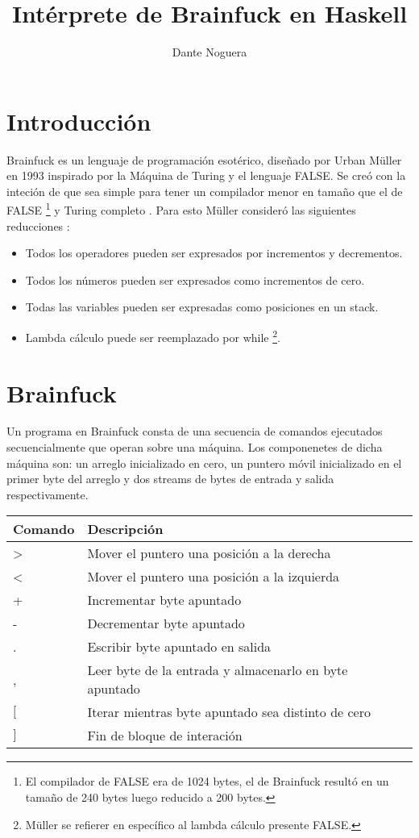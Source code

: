 \documentclass[a4paper, 12pt]{article}
\title{Int\'erprete de Brainfuck en Haskell}
\author{Dante Noguera}
\date{}
\begin{document}
\section*{Introducción}

Brainfuck es un lenguaje de programación esotérico, diseñado por Urban Müller en 1993 inspirado por la Máquina de Turing y el lenguaje FALSE.
Se creó con la inteción de que sea simple para tener un compilador menor en tamaño que el de FALSE \footnote{El compilador de FALSE era de 1024 bytes, el de Brainfuck resultó en un tamaño de 240 bytes luego reducido a 200 bytes.} y Turing completo \cite{w}. 
Para esto Müller consideró las siguientes reducciones \cite{y}:
\begin{itemize}
	\item Todos los operadores pueden ser expresados por incrementos y decrementos.
	\item Todos los números pueden ser expresados como incrementos de cero.
	\item Todas las variables pueden ser expresadas como posiciones en un stack.
	\item Lambda cálculo puede ser reemplazado por while \footnote{Müller se refierer en específico al lambda cálculo presente FALSE.}.
\end{itemize}


\section*{Brainfuck}

Un programa en Brainfuck consta de una secuencia de comandos ejecutados secuencialmente que operan sobre una máquina. Los componenetes de dicha máquina son: un arreglo inicializado en cero, un puntero móvil inicializado en el primer byte del arreglo y dos streams de bytes de entrada y salida respectivamente.

\begin{center}
\begin{tabular}{ |l|l|l| } 
 \hline
 Comando & Descripción \\
 \hline
 \textgreater & Mover el puntero una posición a la derecha \\ 
 \textless & Mover el puntero una posición a la izquierda \\ 
 + & Incrementar byte apuntado \\ 
 - & Decrementar byte apuntado \\ 
 . & Escribir byte apuntado en salida\\ 
 , & Leer byte de la entrada y almacenarlo en byte apuntado \\ 
 $[$ & Iterar mientras byte apuntado sea distinto de cero \\ 
 $]$ & Fin de bloque de interación \\ 
 \hline
\end{tabular}
\end{center}
\end{document}
